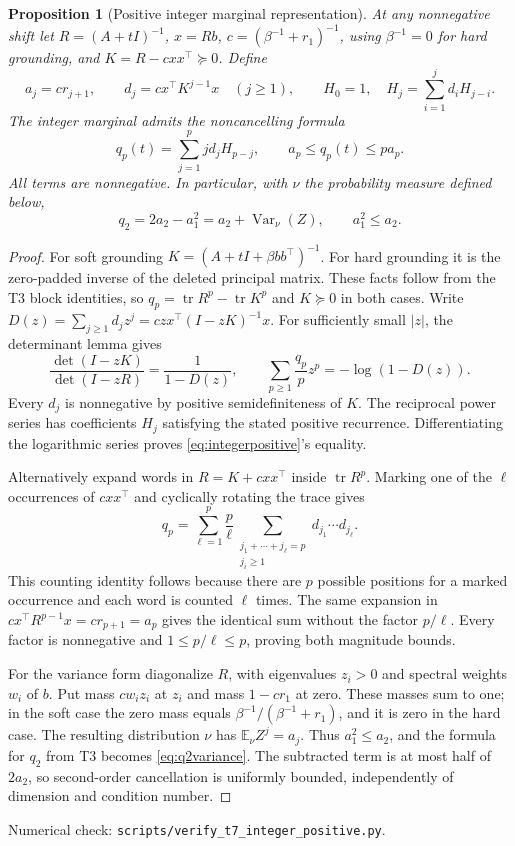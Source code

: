 \documentclass[11pt]{article}
\newtheorem{proposition}[theorem]{Proposition}
\DeclareMathOperator{\tr}{tr}
\newcommand{\E}{\mathbb E}
\begin{document}
\begin{proposition}[Positive integer marginal representation]\label{prop:integerpositive}
At any nonnegative shift let $R=(A+tI)^{-1}$, $x=Rb$,
$c=(\beta^{-1}+r_1)^{-1}$, using $\beta^{-1}=0$ for hard grounding,
and $K=R-cxx^\top\succeq0$. Define
\[
 a_j=cr_{j+1},\qquad d_j=cx^\top K^{j-1}x\quad(j\geq1),
 \qquad H_0=1,\quad H_j=\sum_{i=1}^j d_i H_{j-i}.
\]
The integer marginal admits the noncancelling formula
\begin{equation}\label{eq:integerpositive}
 q_p(t)=\sum_{j=1}^p j d_j H_{p-j},\qquad
 a_p\leq q_p(t)\leq p a_p.
\end{equation}
All terms are nonnegative. In particular, with $\nu$ the probability
measure defined below,
\begin{equation}\label{eq:q2variance}
 q_2=2a_2-a_1^2=a_2+\operatorname{Var}_{\nu}(Z),
 \qquad a_1^2\leq a_2.
\end{equation}
\end{proposition}
\begin{proof}
For soft grounding $K=(A+tI+\beta bb^\top)^{-1}$.
For hard grounding it is the zero-padded inverse of the deleted
principal matrix. These facts follow from the T3 block identities,
so $q_p=\tr R^p-\tr K^p$ and $K\succeq0$ in both cases.
Write $D(z)=\sum_{j\geq1}d_jz^j=czx^\top(I-zK)^{-1}x$.
For sufficiently small $|z|$, the determinant lemma gives
\[
 \frac{\det(I-zK)}{\det(I-zR)}=\frac1{1-D(z)},\qquad
 \sum_{p\geq1}\frac{q_p}{p}z^p=-\log(1-D(z)).
\]
Every $d_j$ is nonnegative by positive semidefiniteness of $K$.
The reciprocal power series has coefficients $H_j$ satisfying the
stated positive recurrence. Differentiating the logarithmic series
proves \eqref{eq:integerpositive}'s equality.

Alternatively expand words in $R=K+cxx^\top$ inside $\tr R^p$.
Marking one of the $\ell$ occurrences of $cxx^\top$ and cyclically
rotating the trace gives
\[
 q_p=\sum_{\ell=1}^p\frac p\ell
       \sum_{\substack{j_1+\cdots+j_\ell=p\\j_i\geq1}}
       d_{j_1}\cdots d_{j_\ell}.
\]
This counting identity follows because there are $p$ possible
positions for a marked occurrence and each word is counted $\ell$
times. The same expansion in $cx^\top R^{p-1}x=cr_{p+1}=a_p$
gives the identical sum without the factor $p/\ell$.
Every factor is nonnegative and $1\leq p/\ell\leq p$, proving
both magnitude bounds.

For the variance form diagonalize $R$, with eigenvalues $z_i>0$
and spectral weights $w_i$ of $b$. Put mass $cw_i z_i$ at $z_i$
and mass $1-cr_1$ at zero. These masses sum to one; in the soft
case the zero mass equals $\beta^{-1}/(\beta^{-1}+r_1)$, and it
is zero in the hard case. The resulting distribution $\nu$ has
$\E_\nu Z^j=a_j$. Thus $a_1^2\leq a_2$, and the formula for
$q_2$ from T3 becomes \eqref{eq:q2variance}. The subtracted term
is at most half of $2a_2$, so second-order cancellation is uniformly
bounded, independently of dimension and condition number.
\end{proof}
\noindent Numerical check: \texttt{scripts/verify\_t7\_integer\_positive.py}.
\end{document}
